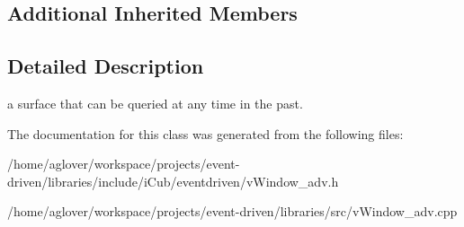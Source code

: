 \subsection*{Additional Inherited Members}


\subsection{Detailed Description}
a surface that can be queried at any time in the past. 

The documentation for this class was generated from the following files\+:\begin{DoxyCompactItemize}
\item 
/home/aglover/workspace/projects/event-\/driven/libraries/include/i\+Cub/eventdriven/v\+Window\+\_\+adv.\+h\item 
/home/aglover/workspace/projects/event-\/driven/libraries/src/v\+Window\+\_\+adv.\+cpp\end{DoxyCompactItemize}
